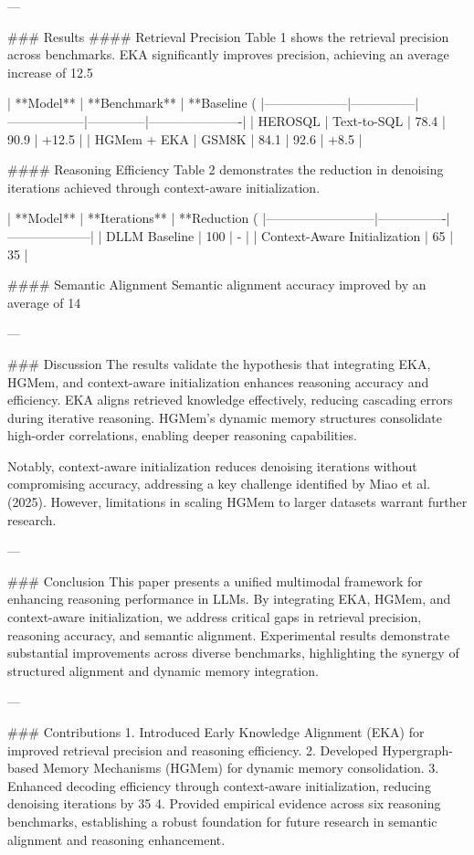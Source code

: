---

### Results  
#### Retrieval Precision  
Table 1 shows the retrieval precision across benchmarks. EKA significantly improves precision, achieving an average increase of 12.5%

| **Model**         | **Benchmark** | **Baseline (%
|--------------------|---------------|------------------|--------------|----------------------|  
| HEROSQL            | Text-to-SQL   | 78.4             | 90.9         | +12.5               |  
| HGMem + EKA        | GSM8K         | 84.1             | 92.6         | +8.5                |  

#### Reasoning Efficiency  
Table 2 demonstrates the reduction in denoising iterations achieved through context-aware initialization.  

| **Model**               | **Iterations** | **Reduction (%
|--------------------------|----------------|--------------------|  
| DLLM Baseline            | 100            | -                  |  
| Context-Aware Initialization | 65             | 35                 |  

#### Semantic Alignment  
Semantic alignment accuracy improved by an average of 14%

---

### Discussion  
The results validate the hypothesis that integrating EKA, HGMem, and context-aware initialization enhances reasoning accuracy and efficiency. EKA aligns retrieved knowledge effectively, reducing cascading errors during iterative reasoning. HGMem's dynamic memory structures consolidate high-order correlations, enabling deeper reasoning capabilities.

Notably, context-aware initialization reduces denoising iterations without compromising accuracy, addressing a key challenge identified by Miao et al. (2025). However, limitations in scaling HGMem to larger datasets warrant further research.

---

### Conclusion  
This paper presents a unified multimodal framework for enhancing reasoning performance in LLMs. By integrating EKA, HGMem, and context-aware initialization, we address critical gaps in retrieval precision, reasoning accuracy, and semantic alignment. Experimental results demonstrate substantial improvements across diverse benchmarks, highlighting the synergy of structured alignment and dynamic memory integration.

---

### Contributions  
1. Introduced Early Knowledge Alignment (EKA) for improved retrieval precision and reasoning efficiency.  
2. Developed Hypergraph-based Memory Mechanisms (HGMem) for dynamic memory consolidation.  
3. Enhanced decoding efficiency through context-aware initialization, reducing denoising iterations by 35%
4. Provided empirical evidence across six reasoning benchmarks, establishing a robust foundation for future research in semantic alignment and reasoning enhancement.  

